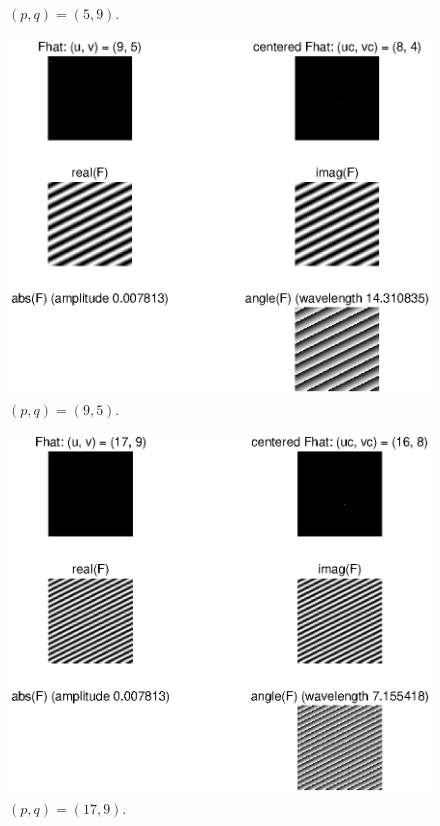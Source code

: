 \documentclass[11pt,a4paper]{article}
\begin{document}
\begin{itemize}
\begin{figure}[!ht]
		\caption{$(p, q) = (5, 9)$.}
		\label{fig:Q1_p_5_q_9}
	\end{figure}
	\begin{figure}[!ht]
		\footnotesize
		\centering
		\includegraphics[width=0.9\columnwidth]{Q1_p_9_q_5.eps}
		\caption{$(p, q) = (9, 5)$.}
		\label{fig:Q1_p_9_q_5}
	\end{figure}
	\begin{figure}[!ht]
		\footnotesize
		\centering
		\includegraphics[width=0.9\columnwidth]{Q1_p_17_q_9.eps}
		\caption{$(p, q) = (17, 9)$.}
		\label{fig:Q1_p_17_q_9}
	\end{figure}
	\begin{figure}[!ht]
		\footnotesize
		\centering

\end{figure}
\end{itemize}
\end{document}
